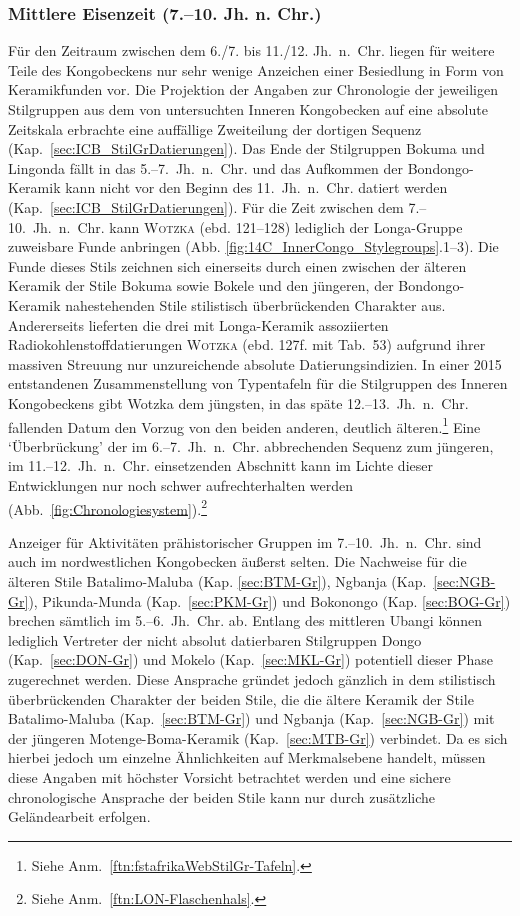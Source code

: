 \subsubsection*{Mittlere Eisenzeit (7.--10. Jh. n. Chr.)}\label{sec:MIA}

Für den Zeitraum zwischen dem 6./7. bis 11./12. Jh.~n.~Chr. liegen für weitere Teile des Kongobeckens nur sehr wenige Anzeichen einer Besiedlung in Form von Keramikfunden vor. Die Projektion der Angaben zur Chronologie der jeweiligen Stilgruppen aus dem von \textcite{Wotzka.1995} untersuchten Inneren Kongobecken auf eine absolute Zeitskala erbrachte eine auffällige Zweiteilung der dortigen Sequenz (Kap.~\ref{sec:ICB_StilGrDatierungen}). Das Ende der Stilgruppen Bokuma und Lingonda fällt in das 5.--7.~Jh.~n.~Chr. und das Aufkommen der Bondongo-Keramik kann nicht vor den Beginn des 11.~Jh.~n.~Chr. datiert werden (Kap.~\ref{sec:ICB_StilGrDatierungen}). Für die Zeit zwischen dem 7.--10.~Jh.~n.~Chr. kann \textsc{Wotzka} (ebd. 121--128) lediglich der Longa-Gruppe zuweisbare Funde anbringen (Abb. \ref{fig:14C_InnerCongo_Stylegroups}.1--3). Die Funde dieses Stils zeichnen sich einerseits durch einen zwischen der älteren Keramik der Stile Bokuma sowie Bokele und den jüngeren, der Bondongo-Keramik nahestehenden Stile stilistisch überbrückenden Charakter aus. Andererseits lieferten die drei mit Longa-Keramik assoziierten Radiokohlenstoffdatierungen \textsc{Wotzka} (ebd. 127f. mit Tab.~53) aufgrund ihrer massiven Streuung nur unzureichende absolute Datierungsindizien. In einer 2015 entstandenen Zusammenstellung von Typentafeln für die Stilgruppen des Inneren Kongobeckens gibt Wotzka dem jüngsten, in das späte 12.--13.~Jh.~n.~Chr. fallenden Datum den Vorzug von den beiden anderen, deutlich älteren.\footnote{Siehe Anm.~\ref{ftn:fstafrikaWebStilGr-Tafeln}.} Eine \enquote*{Überbrückung} der im 6.--7.~Jh.~n.~Chr. abbrechenden Sequenz zum jüngeren, im 11.--12.~Jh.~n.~Chr. einsetzenden Abschnitt kann im Lichte dieser Entwicklungen nur noch schwer aufrechterhalten werden (Abb.~\ref{fig:Chronologiesystem}).\footnote{Siehe Anm.~\ref{ftn:LON-Flaschenhals}.} 

Anzeiger für Aktivitäten prähistorischer Gruppen im 7.--10.~Jh.~n.~Chr. sind auch im nordwestlichen Kongobecken äußerst selten. Die Nachweise für die älteren Stile Batalimo-Maluba (Kap. \ref{sec:BTM-Gr}), Ngbanja (Kap.~\ref{sec:NGB-Gr}), Pikunda-Munda (Kap.~\ref{sec:PKM-Gr}) und Bokonongo (Kap. \ref{sec:BOG-Gr}) brechen sämtlich im 5.--6.~Jh.~Chr. ab. Entlang des mittleren Ubangi können lediglich Vertreter der nicht absolut datierbaren Stilgruppen Dongo (Kap.~\ref{sec:DON-Gr}) und Mokelo (Kap.~\ref{sec:MKL-Gr}) potentiell dieser Phase zugerechnet werden. Diese Ansprache gründet jedoch gänzlich in dem stilistisch überbrückenden Charakter der beiden Stile, die die ältere Keramik der Stile Batalimo-Maluba (Kap.~\ref{sec:BTM-Gr}) und Ngbanja (Kap.~\ref{sec:NGB-Gr}) mit der jüngeren Motenge-Boma-Keramik (Kap.~\ref{sec:MTB-Gr}) verbindet. Da es sich hierbei jedoch um einzelne Ähnlichkeiten auf Merkmalsebene handelt, müssen diese Angaben mit höchster Vorsicht betrachtet werden und eine sichere chronologische Ansprache der beiden Stile kann nur durch zusätzliche Geländearbeit erfolgen.

